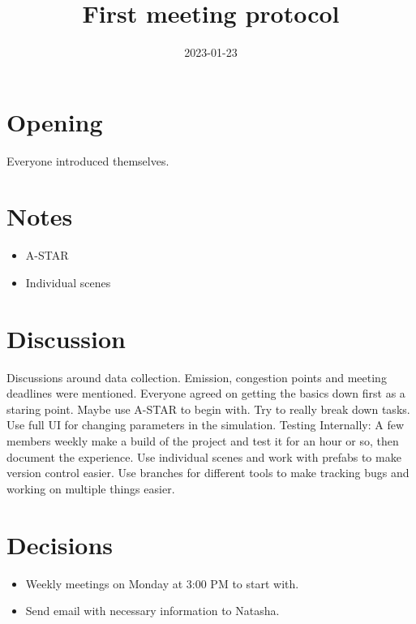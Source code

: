 \documentclass{article}
\newcommand{\meetingdate}{2023-01-23}
\newcommand{\meetingtime}{14:00}
\newcommand{\meetingtitle}{First meeting protocol}
\newcommand{\attendees}{\martin \and \felix \and \hannes \and \marcus \and \jakob}
\begin{document}
    \begin{titlepage}
        \title{\meetingtitle}
        \date{\meetingdate}
        \maketitle
        
        \thispagestyle{first}
        
        \timeanddate{\meetingdate \space \meetingtime}
        \called{\members}
        \attended{\attendees}
    \end{titlepage}
    \newpage
    \pagestyle{fancy}

    \section{Opening}
        Everyone introduced themselves. 

    \section{Notes}
        \begin{itemize}
            \item A-STAR
            \item Individual scenes
        \end{itemize}

    \section{Discussion}
        Discussions around data collection. Emission, congestion points and meeting deadlines were mentioned. Everyone agreed on getting the basics down first as a staring point. Maybe use A-STAR to begin with. Try to really break down tasks. Use full UI for changing parameters in the simulation. Testing Internally: A few members weekly make a build of the project and test it for an hour or so, then document the experience. Use individual scenes and work with prefabs to make version control easier. Use branches for different tools to make tracking bugs and working on multiple things easier.

    \section{Decisions}
    \begin{itemize}
            \item Weekly meetings on Monday at 3:00 PM to start with.
            \item Send email with necessary information to Natasha.
        \end{itemize} 
    
\end{document}

